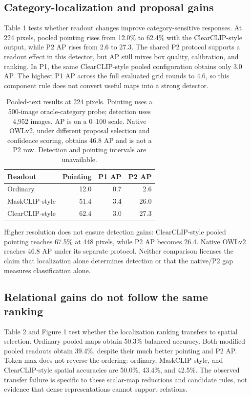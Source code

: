 \documentclass[10pt,twocolumn,letterpaper]{article}
\begin{document}
\subsection{Category-localization and proposal
gains}\label{category-localization-and-proposal-gains}

Table 1 tests whether readout changes improve category-sensitive
responses. At 224 pixels, pooled pointing rises from 12.0\% to 62.4\%
with the ClearCLIP-style output, while P2 AP rises from 2.6 to 27.3. The
shared P2 protocol supports a readout effect in this detector, but AP
still mixes box quality, calibration, and ranking. In P1, the same
ClearCLIP-style pooled configuration obtains only 3.0 AP. The highest P1
AP across the full evaluated grid rounds to 4.6, so this component rule
does not convert useful maps into a strong detector.

\begin{table}[tb]
\centering
\caption{Pooled-text results at 224 pixels. Pointing uses a 500-image
oracle-category probe; detection uses 4,952 images. AP is on a 0--100
scale. Native OWLv2, under different proposal selection and confidence
scoring, obtains 46.8 AP and is not a P2 row. Detection and pointing
intervals are unavailable.}
\label{tab:1}
\begin{tabular}{@{}lrrr@{}}
\toprule
Readout & Pointing & P1 AP & P2 AP \\
\midrule
Ordinary & 12.0 & 0.7 & 2.6 \\
MaskCLIP-style & 51.4 & 3.4 & 26.0 \\
ClearCLIP-style & 62.4 & 3.0 & 27.3 \\
\bottomrule
\end{tabular}
\end{table}

Higher resolution does not ensure detection gains: ClearCLIP-style
pooled pointing reaches 67.5\% at 448 pixels, while P2 AP becomes 26.4.
Native OWLv2 reaches 46.8 AP under its separate protocol. Neither
comparison licenses the claim that localization alone determines
detection or that the native/P2 gap measures classification alone.

\subsection{Relational gains do not follow the same
ranking}\label{relational-gains-do-not-follow-the-same-ranking}

Table 2 and Figure 1 test whether the localization ranking transfers to
spatial selection. Ordinary pooled maps obtain 50.3\% balanced accuracy.
Both modified pooled readouts obtain 39.4\%, despite their much better
pointing and P2 AP. Token-max does not reverse the ordering: ordinary,
MaskCLIP-style, and ClearCLIP-style spatial accuracies are 50.0\%,
43.4\%, and 42.5\%. The observed transfer failure is specific to these
scalar-map reductions and candidate rules, not evidence that dense
representations cannot support relations.
\end{document}
